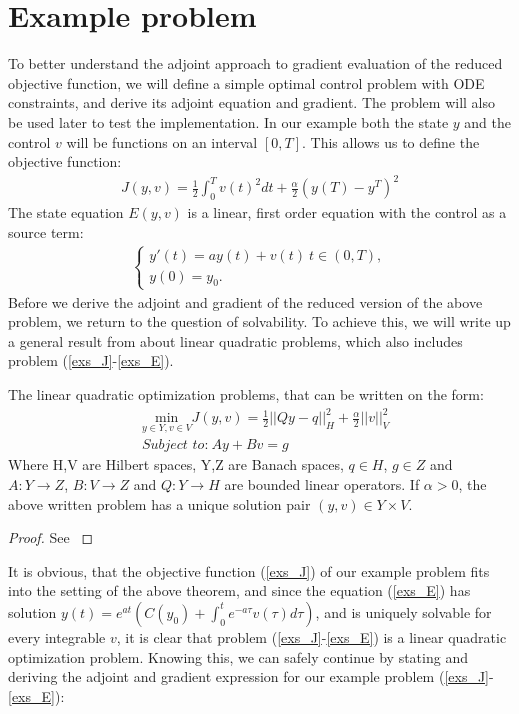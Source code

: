 \section{Example problem}
To better understand the adjoint approach to gradient evaluation of the reduced objective function, we will define a simple optimal control problem with ODE constraints, and derive its adjoint equation and gradient. The problem will also be used later to test the implementation. In our example both the state $y$ and the control $v$ will be functions on an interval $[0,T]$. This allows us to define the objective function:
\begin{align}
J(y,v) = \frac{1}{2}\int_0^Tv(t)^2dt + \frac{\alpha}{2}(y(T)-y^T)^2 \label{exs_J}
\end{align}
The state equation $E(y,v)$ is a linear, first order equation with the control as a source term:
\begin{align}
\left\{
     \begin{array}{lr}
       	y'(t)=ay(t) + v(t) \ t\in(0,T),\\
       	y(0)=y_0.
     \end{array}
   \right. \label{exs_E}
\end{align}
Before we derive the adjoint and gradient of the reduced version of the above problem, we  return to the question of solvability. To achieve this, we will write up a general result from \cite{hinze2008optimization} about linear quadratic problems, which also includes problem (\ref{exs_J}-\ref{exs_E}).
\begin{theorem}
The linear quadratic optimization problems, that can be written on the form:
\begin{align*}
&\underset{y\in Y,v\in V}{\text{min}}J(y,v) = \frac{1}{2}||Qy-q||_H^2 + \frac{\alpha}{2}||v||_V^2 \\
&\textit{Subject to:} \ Ay + Bv = g
\end{align*}
Where H,V are Hilbert spaces, Y,Z are Banach spaces, $q\in H$, $g\in Z$ and $A:Y\rightarrow Z$, $B:V\rightarrow Z$ and $Q:Y\rightarrow H$ are bounded linear operators. If $\alpha>0$, the above written problem has a unique solution pair $(y,v)\in Y\times V$.
\end{theorem}   
\begin{proof}
See \cite{hinze2008optimization}
\end{proof}
It is obvious, that the objective function (\ref{exs_J}) of our example problem fits into the setting of the above theorem, and since the equation (\ref{exs_E}) has solution $y(t) = e^{a t}(C(y_0)+\int_0^te^{-a\tau}v(\tau)d\tau)$, and is uniquely solvable for every integrable $v$, it is clear that problem (\ref{exs_J}-\ref{exs_E}) is a linear quadratic optimization problem. Knowing this, we can safely continue by stating and deriving the adjoint and gradient expression for our example problem (\ref{exs_J}-\ref{exs_E}): 
